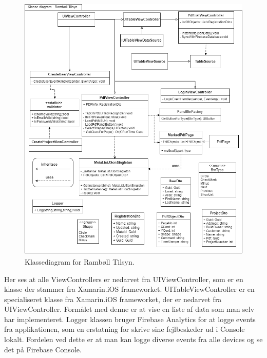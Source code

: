 \begin{figure}[H] %
	\centering
	\includegraphics[height=13cm, width=17cm]{../ArkitekturDesign/OverordnetArkitektur/KlasseDiagram}
	\caption{Klassediagram for Rambøll Tilsyn.}
	\label{fig:KlasseDiagram}
\end{figure}

Her ses at alle ViewControllers er nedarvet fra UIViewController\cite{UIViewController}, som er en klasse der stammer fra Xamarin.iOS frameworket. UITableViewController er en specialiseret klasse fra Xamarin.iOS frameworket, der er nedarvet fra UIViewController. Formålet med denne er at vise en liste af data som man selv har implementeret. Logger klassen bruger Firebase Analytics\cite{FirebaseAnalytic} for at logge events fra applikationen, som en erstatning for skrive sine fejlbeskeder ud i Console lokalt\cite{CON}. Fordelen ved dette er at man kan logge diverse events fra alle devices og se det på Firebase Console.  
